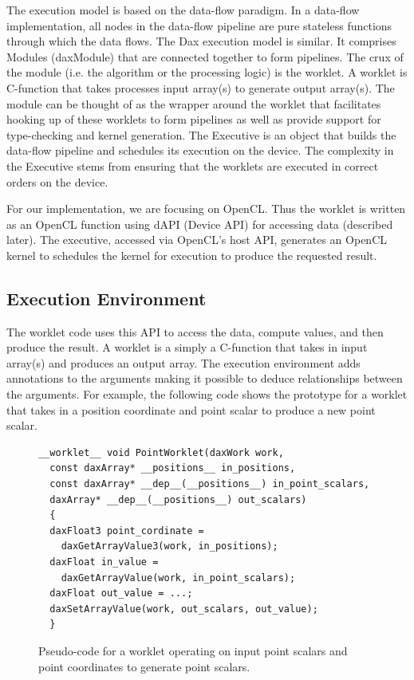 \documentclass{vgtc}                          %
\begin{document}
The execution model is based on the data-flow paradigm. In a data-flow
implementation, all nodes in the data-flow pipeline are pure stateless functions
through which the data flows. The Dax execution model is similar. It comprises
Modules (daxModule) that are connected together to form pipelines. The crux
of the module (i.e. the algorithm or the processing logic) is the worklet. A
worklet is C-function that takes processes input array(s) to generate output
array(s). The module can be thought of as the wrapper around the worklet that
facilitates hooking up of these worklets to form pipelines as well as provide
support for type-checking and kernel generation. The Executive
is an object that builds the data-flow pipeline and schedules its execution on
the device. The complexity in the Executive stems from ensuring that the
worklets are executed in correct orders on the device.

For our implementation, we are focusing on OpenCL. Thus the worklet is
written as an OpenCL function using dAPI (Device API) for accessing data
(described later). The executive, accessed via OpenCL's host API,
generates an OpenCL kernel to schedules the kernel for execution to produce
the requested result.

\subsection{Execution Environment}
\label{sec:ExecutionEnvironment}

The worklet code uses this API to access the data, compute values, and then
produce the result. A worklet is a simply a C-function that takes in input
array(s) and produces an output array. The execution environment adds annotations to the arguments
making it possible to deduce relationships between the arguments. For example, the
following code shows the prototype for a worklet that takes in a position
coordinate and point scalar to produce a new point scalar.

\begin{figure}[htbp]
\centering
\begin{lstlisting}[language=Dax]
__worklet__ void PointWorklet(daxWork work,
  const daxArray* __positions__ in_positions,
  const daxArray* __dep__(__positions__) in_point_scalars,
  daxArray* __dep__(__positions__) out_scalars)
  {
  daxFloat3 point_cordinate =
    daxGetArrayValue3(work, in_positions);
  daxFloat in_value =
    daxGetArrayValue(work, in_point_scalars);
  daxFloat out_value = ...;
  daxSetArrayValue(work, out_scalars, out_value);
  }
\end{lstlisting}
\caption{Pseudo-code for a worklet operating on input point scalars and point
coordinates to generate point scalars.}
\label{fig:DaxPointWorklet}
\end{figure}
\end{document}
